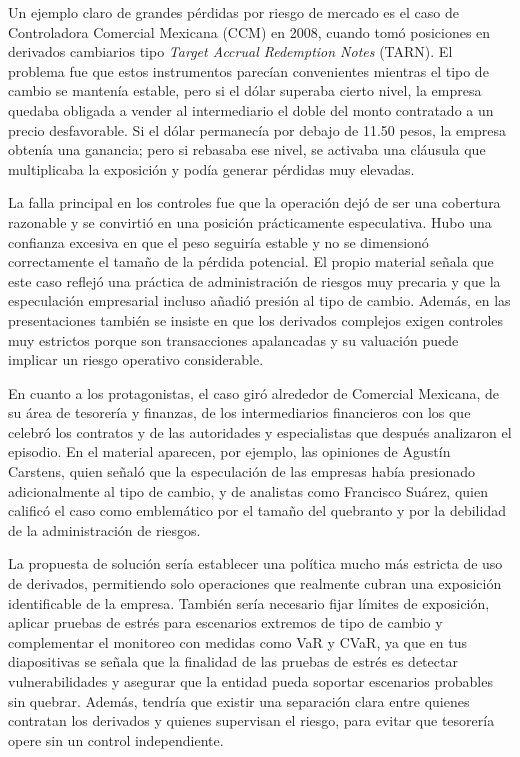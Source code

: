 Un ejemplo claro de grandes p\'erdidas por riesgo de mercado es el caso de Controladora Comercial Mexicana (CCM) en 2008, cuando tom\'o posiciones en derivados cambiarios tipo \textit{Target Accrual Redemption Notes} (TARN). El problema fue que estos instrumentos parec\'ian convenientes mientras el tipo de cambio se manten\'ia estable, pero si el d\'olar superaba cierto nivel, la empresa quedaba obligada a vender al intermediario el doble del monto contratado a un precio desfavorable. Si el d\'olar permanec\'ia por debajo de 11.50 pesos, la empresa obten\'ia una ganancia; pero si rebasaba ese nivel, se activaba una cl\'ausula que multiplicaba la exposici\'on y pod\'ia generar p\'erdidas muy elevadas.

La falla principal en los controles fue que la operaci\'on dej\'o de ser una cobertura razonable y se convirti\'o en una posici\'on pr\'acticamente especulativa. Hubo una confianza excesiva en que el peso seguir\'ia estable y no se dimension\'o correctamente el tama\~no de la p\'erdida potencial. El propio material se\~nala que este caso reflej\'o una pr\'actica de administraci\'on de riesgos muy precaria y que la especulaci\'on empresarial incluso a\~nadi\'o presi\'on al tipo de cambio. Adem\'as, en las presentaciones tambi\'en se insiste en que los derivados complejos exigen controles muy estrictos porque son transacciones apalancadas y su valuaci\'on puede implicar un riesgo operativo considerable.

En cuanto a los protagonistas, el caso gir\'o alrededor de Comercial Mexicana, de su \'area de tesorer\'ia y finanzas, de los intermediarios financieros con los que celebr\'o los contratos y de las autoridades y especialistas que despu\'es analizaron el episodio. En el material aparecen, por ejemplo, las opiniones de Agust\'in Carstens, quien se\~nal\'o que la especulaci\'on de las empresas hab\'ia presionado adicionalmente al tipo de cambio, y de analistas como Francisco Su\'arez, quien calific\'o el caso como emblem\'atico por el tama\~no del quebranto y por la debilidad de la administraci\'on de riesgos.

La propuesta de soluci\'on ser\'ia establecer una pol\'itica mucho m\'as estricta de uso de derivados, permitiendo solo operaciones que realmente cubran una exposici\'on identificable de la empresa. Tambi\'en ser\'ia necesario fijar l\'imites de exposici\'on, aplicar pruebas de estr\'es para escenarios extremos de tipo de cambio y complementar el monitoreo con medidas como VaR y CVaR, ya que en tus diapositivas se se\~nala que la finalidad de las pruebas de estr\'es es detectar vulnerabilidades y asegurar que la entidad pueda soportar escenarios probables sin quebrar. Adem\'as, tendr\'ia que existir una separaci\'on clara entre quienes contratan los derivados y quienes supervisan el riesgo, para evitar que tesorer\'ia opere sin un control independiente.

